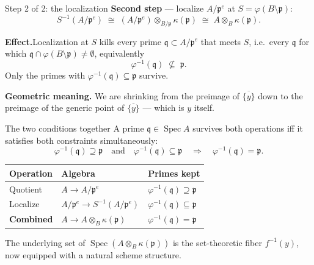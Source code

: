 \documentclass[aspectratio=169,12pt]{beamer}
\begin{document}
\begin{frame}{Step 2 of 2: the localization}
  \textbf{Second step} — localize $A/\mathfrak{p}^e$ at
  $S = \varphi(B \setminus \mathfrak{p})$:
  \[
    S^{-1}(A/\mathfrak{p}^e)
    \;\cong\;
    (A/\mathfrak{p}^e) \otimes_{B/\mathfrak{p}} \kappa(\mathfrak{p})
    \;\cong\;
    A \otimes_B \kappa(\mathfrak{p}).
  \]

  \medskip

  \textbf{Effect.}\enspace Localization at $S$ kills every prime
  $\mathfrak{q} \subset A/\mathfrak{p}^e$ that meets $S$,
  i.e.\ every $\mathfrak{q}$ for which
  $\mathfrak{q} \cap \varphi(B\setminus\mathfrak{p}) \neq \emptyset$,
  equivalently
  \[
    \varphi^{-1}(\mathfrak{q}) \;\not\subseteq\; \mathfrak{p}.
  \]
  Only the primes with $\varphi^{-1}(\mathfrak{q}) \subseteq \mathfrak{p}$
  survive.

  \medskip

  \textbf{Geometric meaning.}\enspace
  We are shrinking from the preimage of $\overline{\{y\}}$ down to the
  preimage of the generic point of $\overline{\{y\}}$ — which is $y$ itself.
\end{frame}

\begin{frame}{The two conditions together}
  A prime $\mathfrak{q} \in \operatorname{Spec} A$ survives both operations
  iff it satisfies both constraints simultaneously:
  \[
    \varphi^{-1}(\mathfrak{q}) \supseteq \mathfrak{p}
    \quad\text{and}\quad
    \varphi^{-1}(\mathfrak{q}) \subseteq \mathfrak{p}
    \quad\Longrightarrow\quad
    \varphi^{-1}(\mathfrak{q}) = \mathfrak{p}.
  \]

  \medskip

  \renewcommand{\arraystretch}{1.5}
  \begin{tabular}{@{\hspace{4pt}}lll@{\hspace{4pt}}}
    \toprule
    \textbf{Operation} & \textbf{Algebra} & \textbf{Primes kept} \\
    \midrule
    Quotient  & $A \to A/\mathfrak{p}^e$
              & $\varphi^{-1}(\mathfrak{q}) \supseteq \mathfrak{p}$ \\
    Localize  & $A/\mathfrak{p}^e \to S^{-1}(A/\mathfrak{p}^e)$
              & $\varphi^{-1}(\mathfrak{q}) \subseteq \mathfrak{p}$ \\
    \midrule
    \textbf{Combined} & $A \to A \otimes_B \kappa(\mathfrak{p})$
              & $\varphi^{-1}(\mathfrak{q}) = \mathfrak{p}$ \\
    \bottomrule
  \end{tabular}

  \medskip

  The underlying set of $\operatorname{Spec}(A \otimes_B \kappa(\mathfrak{p}))$
  is the set-theoretic fiber $f^{-1}(y)$, now equipped with a natural
  scheme structure.
\end{frame}
\end{document}
